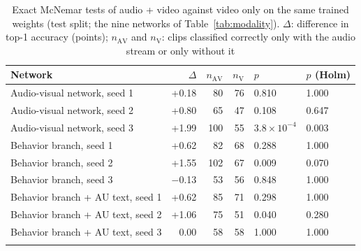 \documentclass[pdflatex,sn-basic]{sn-jnl}
\begin{document}
\begin{table}[t]
\caption{Exact McNemar tests of audio + video against video only on the same trained weights (test split; the nine networks of Table~\ref{tab:modality}). $\Delta$: difference in top-1 accuracy (points); $n_{\mathrm{AV}}$ and $n_{\mathrm{V}}$: clips classified correctly only with the audio stream or only without it}\label{tab:sig_audio}
\begin{tabular*}{\textwidth}{@{\extracolsep\fill}lrrrll}
\toprule
Network & $\Delta$ & $n_{\mathrm{AV}}$ & $n_{\mathrm{V}}$ & $p$ & $p$ (Holm)\\
\midrule
Audio-visual network, seed 1 & +0.18 & 80 & 76 & 0.810 & 1.000\\
Audio-visual network, seed 2 & +0.80 & 65 & 47 & 0.108 & 0.647\\
Audio-visual network, seed 3 & +1.99 & 100 & 55 & $3.8 \times 10^{-4}$ & 0.003\\
Behavior branch, seed 1 & +0.62 & 82 & 68 & 0.288 & 1.000\\
Behavior branch, seed 2 & +1.55 & 102 & 67 & 0.009 & 0.070\\
Behavior branch, seed 3 & $-$0.13 & 53 & 56 & 0.848 & 1.000\\
Behavior branch + AU text, seed 1 & +0.62 & 85 & 71 & 0.298 & 1.000\\
Behavior branch + AU text, seed 2 & +1.06 & 75 & 51 & 0.040 & 0.280\\
Behavior branch + AU text, seed 3 & 0.00 & 58 & 58 & 1.000 & 1.000\\
\botrule
\end{tabular*}
\end{table}
\end{document}

